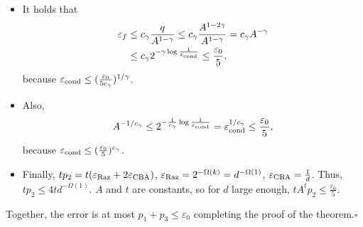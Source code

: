 \begin{itemize}
\item It holds that
\begin{align*}
\varepsilon_f&\le c_\gamma\frac q{A^{1-\gamma}}\le c_\gamma\frac{A^{1-2\gamma}}{A^{1-\gamma}}=c_\gamma A^{-\gamma}\\
&\le c_\gamma2^{-\gamma\log\frac1{\varepsilon_{\rm cond}}}\le\frac{\varepsilon_0}5,
\end{align*}
because $\varepsilon_{\rm cond}\le(\frac{\varepsilon_0}{5c_\gamma})^{1/\gamma}$.
\item Also,
\[A^{-1/c_\gamma}\le2^{-\frac1{c_\gamma}\log\frac1{\varepsilon_{\rm cond}}}=\varepsilon_{\rm cond}^{1/c_\gamma}\le\frac{\varepsilon_0}5,\]
because $\varepsilon_{\rm cond}\le(\frac{\varepsilon_0}5)^{c_\gamma}$.
\item Finally, $tp_2=t(\varepsilon_{\rm Raz}+2\varepsilon_{\rm CBA})$, $\varepsilon_{\rm Raz}=2^{-\Omega(k)}=d^{-\Omega(1)}$, $\varepsilon_{\rm CBA}=\frac1d$. Thus, $tp_2\le4td^{-\Omega(1)}$. $A$ and $t$ are constants, so for $d$ large enough, $tA^tp_2\le\frac{\varepsilon_0}5$.
\end{itemize}
Together, the error is at most $p_1+p_3\le\varepsilon_0$ completing the proof of the theorem.\hfill$\square$
